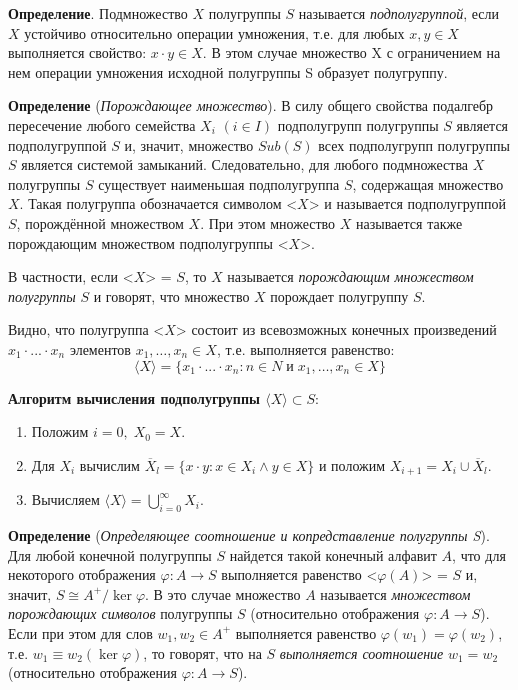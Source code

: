 \documentclass[spec, och, otchet, hidelinks]{SCWorks}
\newcommand{\tbf}[1]{\textbf{#1}}
\begin{document}
\par \tbf{Определение}. Подмножество $X$ полугруппы $S$ называется
\textit{подполугруппой}, если $X$ устойчиво относительно операции
умножения, т.е. для любых $x, y \in X$ выполняется свойство: $x \cdot y \in X$.
В этом случае множество X с ограничением на нем операции
умножения исходной полугруппы S образует полугруппу. \\

\par \tbf{Определение} (\textit{Порождающее множество}). В силу общего свойства
подалгебр пересечение любого семейства $X_i$
$(i\in I)$ подполугрупп полугруппы $S$ является подполугруппой $S$ и,
значит, множество $Sub(S)$ всех подполугрупп полугруппы $S$ является
системой замыканий. Следовательно, для любого подмножества $X$
полугруппы $S$ существует наименьшая подполугруппа $S$, содержащая
множество $X$. Такая полугруппа обозначается символом <$X$> и
называется подполугруппой $S$, порождённой множеством $X$. При
этом множество $X$ называется также порождающим множеством
подполугруппы <$X$>. 

\par В частности, если <$X$> = $S$, то $X$ называется \textit{порождающим
множеством полугруппы} $S$ и говорят, что множество $X$ порождает
полугруппу $S$. 

\par Видно, что полугруппа <$X$> состоит из всевозможных
конечных произведений $x_1 \cdot ... \cdot x_n$ элементов $x_1, \dots, x_n \in
X$, т.е. выполняется равенство: $$ 〈X〉 = \{x_1 \cdot ... \cdot x_n: n \in N \;
\text{и} \; x_1, \dots, x_n \in X\} $$

\par \tbf{Алгоритм вычисления подполугруппы $〈X〉 \subset S:$}
\begin{enumerate}
\item Положим $i = 0, \; X_0 = X$.
\item Для $X_i$ вычислим $\overline X_l = \{x \cdot y : x \in X_i \wedge y \in
  X\}$ и положим $X_{i + 1} = X_i \cup \overline X_l$.
\item Вычисляем $〈X〉 = \bigcup\limits_{i = 0}^{\infty} X_i$.
\end{enumerate}

\newpage

\par \tbf{Определение} (\textit{Определяющее соотношение и копредставление
  полугруппы S}). Для любой конечной
полугруппы $S$ найдется такой конечный алфавит $A$, что для некоторого отображения
$ \varphi: A \rightarrow S$ выполняется равенство <$\varphi(A)$> = $S$ и,
значит, $S \cong A^{+} \slash \ker \varphi$. В это случае множество $A$
называется \textit{множеством порождающих символов} полугруппы $S$ (относительно
отображения $\varphi: A \rightarrow S $). Если при этом для слов $w_1, w_2 \in
A^{+}$ выполняется равенство $\varphi(w_1) = \varphi(w_2)$, т.е. $w_1 \equiv w_2
(\ker \varphi)$, то говорят, что на $S$ \textit{выполняется соотношение} $w_1 =
w_2$ (относительно отображения $\varphi: A \rightarrow S$).
\end{document}
